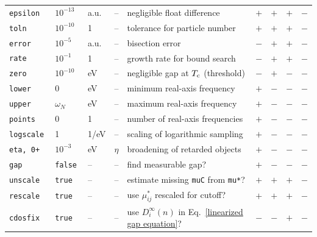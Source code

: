 \documentclass[a4paper]{article}
\def\sub#1{\sb{\mathrm{#1}}}
\newlength\gap
\begin{document}
\begin{table}[b]
\begin{tabular}{*9l}
         \tt epsilon       & $10^{-13}$  & a.u.             & --                  & negligible float difference                & $+$ & $+$ & $+$ & $-$ \\
         \tt toln          & $10^{-10}$  & 1                & --                  & tolerance for particle number              & $+$ & $+$ & $+$ & $-$ \\
         \tt error         & $10^{-5}$   & a.u.             & --                  & bisection error                            & $-$ & $+$ & $+$ & $-$ \\
         \tt rate          & $10^{-1}$   & 1                & --                  & growth rate for bound search               & $-$ & $+$ & $+$ & $-$ \\
         \tt zero          & $10^{-10}$  & eV               & --                  & negligible gap at $T \sub c$ (threshold)   & $-$ & $+$ & $-$ & $-$ \\
         [\gap]
         \tt lower         & 0           & eV               & --                  & minimum real-axis frequency                & $+$ & $-$ & $-$ & $-$ \\
         \tt upper         & $\omega_N$  & eV               & --                  & maximum real-axis frequency                & $+$ & $-$ & $-$ & $-$ \\
         \tt points        & 0           & 1                & --                  & number of real-axis frequencies            & $+$ & $-$ & $-$ & $-$ \\
         \tt logscale      & 1           & 1/eV             & --                  & scaling of logarithmic sampling            & $+$ & $-$ & $-$ & $-$ \\
         \tt eta, 0+       & $10^{-3}$   & eV               & $\eta$              & broadening of retarded objects             & $+$ & $-$ & $-$ & $-$ \\
         [\gap]
         \tt gap           & \tt false   & --               & --                  & find measurable gap?                       & $+$ & $-$ & $-$ & $-$ \\
         [\gap]
         \tt unscale       & \tt true    & --               & --                  & estimate missing {\tt muC} from {\tt mu*}? & $+$ & $+$ & $+$ & $-$ \\
         \tt rescale       & \tt true    & --               & --                  & use $\mu^*_{i j}$ rescaled for cutoff?     & $+$ & $+$ & $+$ & $-$ \\
         \tt cdosfix       & \tt true    & --               & --   & use $D_i^\infty(n)$ in Eq.~\ref{linearized gap equation}? & $-$ & $-$ & $+$ & $-$ \\

\end{tabular}
\end{table}
\end{document}
